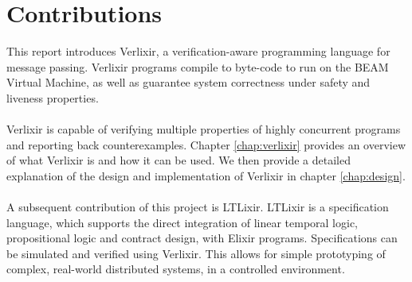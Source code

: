 \section{Contributions}
This report introduces Verlixir, a verification-aware programming language for message passing. Verlixir programs compile to byte-code to run on the BEAM Virtual Machine, as well as guarantee system correctness under safety and liveness properties.
\\ \\
Verlixir is capable of verifying multiple properties of highly concurrent programs and reporting back counterexamples. Chapter \ref{chap:verlixir} provides an overview of what Verlixir is and how it can be used. We then provide a detailed explanation of the design and implementation of Verlixir in chapter \ref{chap:design}.
\\ \\
A subsequent contribution of this project is LTLixir. LTLixir is a specification language, which supports the direct integration of linear temporal logic, propositional logic and contract design, with Elixir programs. Specifications can be simulated and verified using Verlixir. This allows for simple prototyping of complex, real-world distributed systems, in a controlled environment.